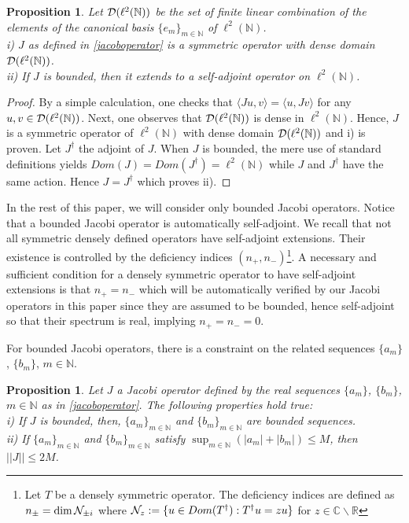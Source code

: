 \documentclass[a4paper]{jpconf}
\numberwithin{equation}{section}
\newtheorem{proposition}[Theorem]{Proposition}
\theoremstyle{nonumberplain}
\newtheorem{proof}{Proof}
\begin{document}
\begin{proposition}\label{extend-self}
Let ${\cal{D}}(\ell^2(\mathbb{N}))$ be the set of finite linear combination of the elements of the canonical basis $\{e_m\}_{m\in\mathbb{N}}$ of $\ell^2(\mathbb{N})$.\\ i) $J$ as defined in \eqref{jacoboperator} is a symmetric operator with dense domain ${\cal{D}}(\ell^2(\mathbb{N}))$. \\
ii) If $J$ is bounded, then it extends to a self-adjoint operator on $\ell^2(\mathbb{N})$.
\end{proposition}
\begin{proof}
By a simple calculation, one checks that $\langle Ju,v \rangle=\langle u,Jv \rangle$ for any $u,v\in{\cal{D}}(\ell^2(\mathbb{N}))$. Next, one observes that ${\cal{D}}(\ell^2(\mathbb{N}))$ is dense in $\ell^2(\mathbb{N})$. Hence, $J$ is a symmetric operator of $\ell^2(\mathbb{N})$ with dense domain ${\cal{D}}(\ell^2(\mathbb{N}))$ and i) is proven. Let $J^\dag$ the adjoint of $J$. When $J$ is bounded, the mere use of standard definitions yields $Dom(J)=Dom(J^\dag)=\ell^2(\mathbb{N})$ while $J$ and $J^\dag$ have the same action. Hence 
$J=J^\dag$ which proves ii).
\end{proof}
In the rest of this paper, we will consider only bounded Jacobi operators. Notice that a bounded Jacobi operator is automatically self-adjoint. We recall that not all symmetric densely defined operators have self-adjoint extensions. Their existence is controlled by the deficiency indices $(n_+,n_-)${\footnote{Let $T$ be a densely symmetric operator. The deficiency indices are defined as $n_\pm=\dim{\cal{N}}_{\pm i}$ where ${\cal{N}}_z:=\{u\in Dom(T^\dag):T^\dag u=zu \}$ for $z\in\mathbb{C}\backslash\mathbb{R}$}}. A necessary and sufficient condition for a densely symmetric operator to have self-adjoint extensions is that $n_+=n_-$ which will be automatically verified by our Jacobi operators in this paper since they are  assumed to be bounded, hence self-adjoint so that their spectrum is real, implying $n_+=n_-=0$.\par
For bounded Jacobi operators, there is a constraint on the related sequences $\{a_m\}$, $\{b_m\}$, $m\in\mathbb{N}$.
\begin{proposition}\label{jaco-bounded}
Let $J$ a Jacobi operator defined by the real sequences $\{a_m\}$, $\{b_m\}$, $m\in\mathbb{N}$ as in \eqref{jacoboperator}. The following properties hold true:\\
i) If $J$ is bounded, then, $\{a_m\}_{m\in\mathbb{N}}$ and $\{b_m\}_{m\in\mathbb{N}}$ are bounded sequences.\\
ii) If $\{a_m\}_{m\in\mathbb{N}}$ and $\{b_m\}_{m\in\mathbb{N}}$ satisfy $\sup_{m\in\mathbb{N}}(|a_m|+|b_m|)\le M$, then $||J||\le2 M$.
\end{proposition}
\end{document}
